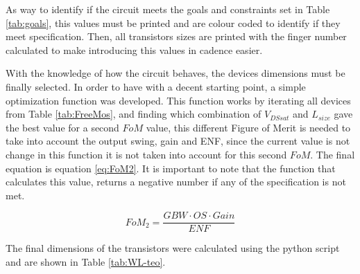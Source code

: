 As way to identify if the circuit meets the goals and constraints set in Table \ref{tab:goals}, this values must be printed and are colour coded to identify if they meet specification. Then, all transistors sizes are printed with the finger number calculated to make introducing this values in cadence easier. 

With the knowledge of how the circuit behaves, the devices dimensions must be finally selected. In order to have with a decent starting point, a simple optimization function was developed. This function works by iterating all devices from Table \ref{tab:FreeMos}, and finding which combination of $V_{DSsat}$ and $L_{size}$ gave the best value for a second $FoM$ value, this different Figure of Merit is needed to take into account the output swing, gain and ENF, since the current value is not change in this function it is not taken into account for this second $FoM$. The final equation is equation \ref{eq:FoM2}. It is important to note that the function that calculates this value, returns a negative number if any of the specification is not met.

\begin{equation}
    \label{eq:FoM2}
    FoM_2 = \frac{GBW\cdot OS \cdot Gain}{ENF}
\end{equation}

The final dimensions of the transistors were calculated using the python script and are shown in Table \ref{tab:WL-teo}.

